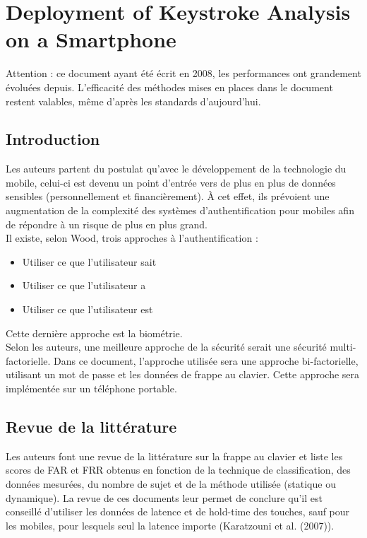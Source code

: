 \section{Deployment of Keystroke Analysis on a Smartphone\cite{buchoux2008}}

Attention : ce document ayant été écrit en 2008, les performances ont grandement évoluées depuis. L'efficacité des méthodes mises en places dans le document restent valables, même d'après les standards d'aujourd'hui.

\subsection{Introduction}

Les auteurs partent du postulat qu'avec le développement de la technologie du mobile, celui-ci est devenu un point d'entrée vers de plus en plus de données sensibles (personnellement et financièrement). À cet effet, ils prévoient une augmentation de la complexité des systèmes d'authentification pour mobiles afin de répondre à un risque de plus en plus grand.\\

Il existe, selon Wood, trois approches à l'authentification :\\

\begin{itemize}
  \item Utiliser ce que l'utilisateur sait
  \item Utiliser ce que l'utilisateur a
  \item Utiliser ce que l'utilisateur est\\
\end{itemize}

Cette dernière approche est la biométrie.\\

Selon les auteurs, une meilleure approche de la sécurité serait une sécurité multi-factorielle. Dans ce document, l'approche utilisée sera une approche bi-factorielle, utilisant un mot de passe et les données de frappe au clavier. Cette approche sera implémentée sur un téléphone portable.

\subsection{Revue de la littérature}

Les auteurs font une revue de la littérature sur la frappe au clavier et liste les scores de FAR et FRR obtenus en fonction de la technique de classification, des données mesurées, du nombre de sujet et de la méthode utilisée (statique ou dynamique). La revue de ces documents leur permet de conclure qu'il est conseillé d'utiliser les données de latence et de hold-time des touches, sauf pour les mobiles, pour lesquels seul la latence importe (Karatzouni et al. (2007)).

